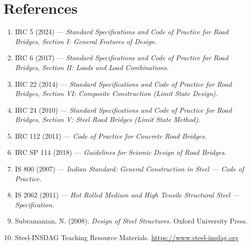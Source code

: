 \documentclass[12pt,a4paper]{report}
\numberwithin{table}{chapter}
\numberwithin{figure}{chapter}
\begin{document}
\chapter*{References}


\begin{enumerate}

\item IRC 5 (2024) --- \textit{Standard Specifications and Code of Practice for Road Bridges, Section I: General Features of Design.}

\item IRC 6 (2017) --- \textit{Standard Specifications and Code of Practice for Road Bridges, Section II: Loads and Load Combinations.}

\item IRC 22 (2014) --- \textit{Standard Specifications and Code of Practice for Road Bridges, Section VI: Composite Construction (Limit State Design).}

\item IRC 24 (2010) --- \textit{Standard Specifications and Code of Practice for Road Bridges, Section V: Steel Road Bridges (Limit State Method).}

\item IRC 112 (2011) --- \textit{Code of Practice for Concrete Road Bridges.}

\item IRC SP 114 (2018) --- \textit{Guidelines for Seismic Design of Road Bridges.}

\item IS 800 (2007) --- \textit{Indian Standard: General Construction in Steel --- Code of Practice.}

\item IS 2062 (2011) --- \textit{Hot Rolled Medium and High Tensile Structural Steel --- Specification.}

\item Subramanian, N. (2008). \textit{Design of Steel Structures.} Oxford University Press.

\item Steel-INSDAG Teaching Resource Materials. \url{https://www.steel-insdag.org}

\end{enumerate}
\end{document}
